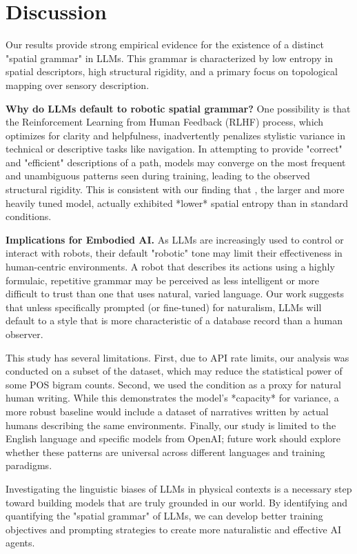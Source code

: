 \section{Discussion}
\label{sec:discussion}

Our results provide strong empirical evidence for the existence of a distinct "spatial grammar" in LLMs. This grammar is characterized by low entropy in spatial descriptors, high structural rigidity, and a primary focus on topological mapping over sensory description.

{\bf Why do LLMs default to robotic spatial grammar?} One possibility is that the Reinforcement Learning from Human Feedback (RLHF) process, which optimizes for clarity and helpfulness, inadvertently penalizes stylistic variance in technical or descriptive tasks like navigation. In attempting to provide "correct" and "efficient" descriptions of a path, models may converge on the most frequent and unambiguous patterns seen during training, leading to the observed structural rigidity. This is consistent with our finding that \gpto, the larger and more heavily tuned model, actually exhibited *lower* spatial entropy than \gptom in standard conditions.

{\bf Implications for Embodied AI.} As LLMs are increasingly used to control or interact with robots, their default "robotic" tone may limit their effectiveness in human-centric environments. A robot that describes its actions using a highly formulaic, repetitive grammar may be perceived as less intelligent or more difficult to trust than one that uses natural, varied language. Our work suggests that unless specifically prompted (or fine-tuned) for naturalism, LLMs will default to a style that is more characteristic of a database record than a human observer.

This study has several limitations. First, due to API rate limits, our analysis was conducted on a subset of the \babi dataset, which may reduce the statistical power of some POS bigram counts. Second, we used the \humanprompt condition as a proxy for natural human writing. While this demonstrates the model's *capacity* for variance, a more robust baseline would include a dataset of narratives written by actual humans describing the same environments. Finally, our study is limited to the English language and specific models from OpenAI; future work should explore whether these patterns are universal across different languages and training paradigms.

Investigating the linguistic biases of LLMs in physical contexts is a necessary step toward building models that are truly grounded in our world. By identifying and quantifying the "spatial grammar" of LLMs, we can develop better training objectives and prompting strategies to create more naturalistic and effective AI agents.
